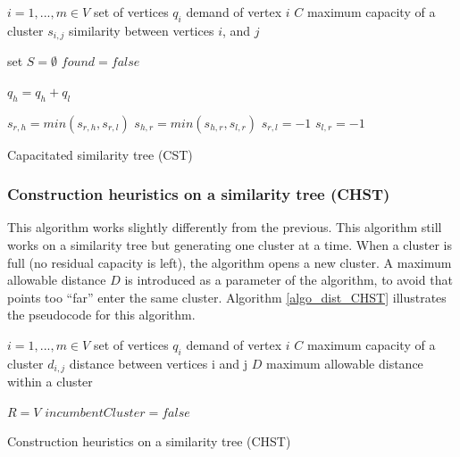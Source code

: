 \begin{algorithm}[H]
\DontPrintSemicolon
\SetAlgoLined

$i = 1,...,m \in V$ set of vertices\;
$q_i$ demand of vertex $i$\;
$C$ maximum capacity of a cluster \;
$s_{i,j}$ similarity between vertices $i$, and $j$ \;
{
set $S=\emptyset$\;
$found=false$\;

$q_h=q_h+q_l$\;
{
$s_{r,h}=min(s_{r,h},s_{r,l})$\;
$s_{h,r}=min(s_{h,r},s_{l,r})$\;
$s_{r,l}=-1$\;
$s_{l,r}=-1$\;

}
}

\caption{Capacitated similarity tree (CST)}
\label{algo_dist_CST}   
    

\end{algorithm}

\subsubsection{Construction heuristics on a similarity tree (CHST)}
This algorithm works slightly differently from the previous. This algorithm still works on a similarity tree but generating one cluster at a time. When a cluster is full (no residual capacity is left), the algorithm opens a new cluster. A maximum allowable distance $D$ is introduced as a parameter of the algorithm, to avoid that points too “far” enter the same cluster. Algorithm \ref{algo_dist_CHST} illustrates the pseudocode for this algorithm.

\begin{algorithm}[H]
\DontPrintSemicolon
\SetAlgoLined

$i = 1,...,m \in V$ set of vertices\;
$q_i$ demand of vertex $i$\;
$C$ maximum capacity of a cluster \;
$d_{i,j}$ distance between vertices i and j \;
$D$ maximum allowable distance within a cluster \;

$R=V$ \;
$incumbentCluster=false$ \;


\caption{Construction heuristics on a similarity tree (CHST)}
\label{algo_dist_CHST}       

\end{algorithm}


